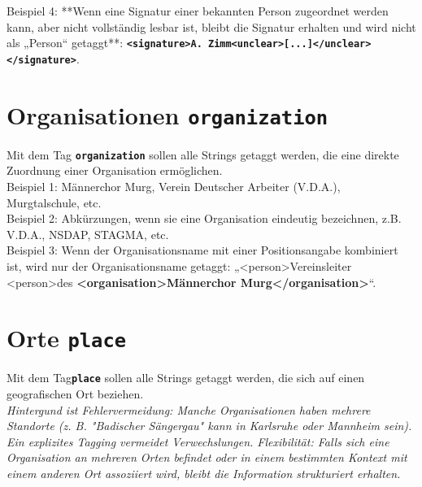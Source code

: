 \documentclass{article}
\begin{document}
 Beispiel 4: **Wenn eine Signatur einer bekannten Person zugeordnet werden kann, aber nicht vollständig lesbar ist, bleibt die Signatur erhalten und wird nicht als „Person“ getaggt**:  
\texttt{\textbf{\textless signature\textgreater A. Zimm\textless unclear\textgreater [...]\textless /unclear\textgreater\textless /signature\textgreater}}.\\  

\section*{Organisationen \texttt{\texttt{\textbf{{\colorbox{organization}{organization}}}}}}


Mit dem Tag \texttt{\texttt{\textbf{{\colorbox{organization}{organization}}}}} sollen alle Strings getaggt werden, die eine direkte Zuordnung einer Organisation ermöglichen. \\

\noindent{} Beispiel 1: Männerchor Murg, Verein Deutscher Arbeiter (V.D.A.), Murgtalschule, etc.\\
 Beispiel 2: Abkürzungen, wenn sie eine Organisation eindeutig bezeichnen, z.B. V.D.A., NSDAP, STAGMA, etc.\\
 Beispiel 3: Wenn der Organisationsname mit einer Positionsangabe kombiniert ist, wird nur der Organisationsname getaggt: „\textless person\textgreater Vereinsleiter \textless person\textgreater des \textbf{\textless organisation\textgreater Männerchor Murg\textless /organisation\textgreater}“. \\

\section*{Orte \texttt{\texttt{\textbf{{\colorbox{place}{place}}}}}}


Mit dem Tag\texttt{\texttt{\textbf{{\colorbox{place}{place}}}}} sollen alle Strings getaggt werden, die sich auf einen geografischen Ort beziehen. \\
\indent\textit{Hintergund ist Fehlervermeidung: Manche Organisationen haben mehrere Standorte (z. B. "Badischer Sängergau" kann in Karlsruhe oder Mannheim sein). Ein explizites Tagging vermeidet Verwechslungen.
Flexibilität: Falls sich eine Organisation an mehreren Orten befindet oder in einem bestimmten Kontext mit einem anderen Ort assoziiert wird, bleibt die Information strukturiert erhalten.} \\
\end{document}
